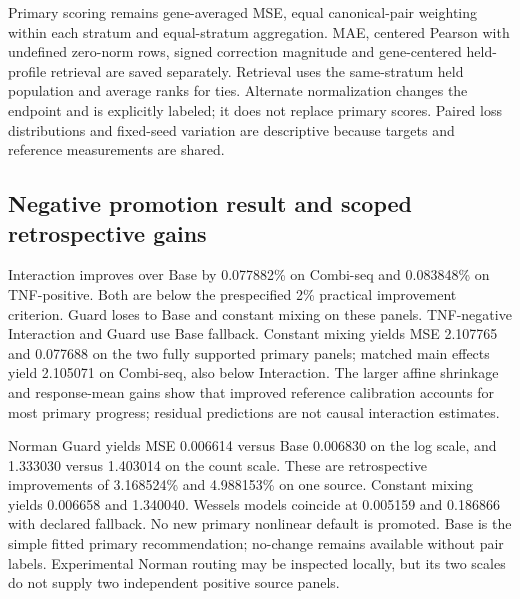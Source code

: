 Primary scoring remains gene-averaged MSE, equal canonical-pair weighting within each stratum and equal-stratum aggregation. MAE, centered Pearson with undefined zero-norm rows, signed correction magnitude and gene-centered held-profile retrieval are saved separately. Retrieval uses the same-stratum held population and average ranks for ties. Alternate normalization changes the endpoint and is explicitly labeled; it does not replace primary scores. Paired loss distributions and fixed-seed variation are descriptive because targets and reference measurements are shared.

\begin{table}[htbp]\centering\small

\caption{Full-label primary MSE, uniform acquisition seed 11 and the prespecified training seed. Every method uses the unchanged evaluation population. TNF-negative constant mixing lacks support in four of twelve folds, so its eligible-only mean cannot fill this table. Columns have different units and are not pooled.}
\end{table}

\subsection{Negative promotion result and scoped retrospective gains}
Interaction improves over Base by 0.077882\% on Combi-seq and 0.083848\% on TNF-positive. Both are below the prespecified 2\% practical improvement criterion. Guard loses to Base and constant mixing on these panels. TNF-negative Interaction and Guard use Base fallback. Constant mixing yields MSE 2.107765 and 0.077688 on the two fully supported primary panels; matched main effects yield 2.105071 on Combi-seq, also below Interaction. The larger affine shrinkage and response-mean gains show that improved reference calibration accounts for most primary progress; residual predictions are not causal interaction estimates.

Norman Guard yields MSE 0.006614 versus Base 0.006830 on the log scale, and 1.333030 versus 1.403014 on the count scale. These are retrospective improvements of 3.168524\% and 4.988153\% on one source. Constant mixing yields 0.006658 and 1.340040. Wessels models coincide at 0.005159 and 0.186866 with declared fallback. No new primary nonlinear default is promoted. Base is the simple fitted primary recommendation; no-change remains available without pair labels. Experimental Norman routing may be inspected locally, but its two scales do not supply two independent positive source panels.

